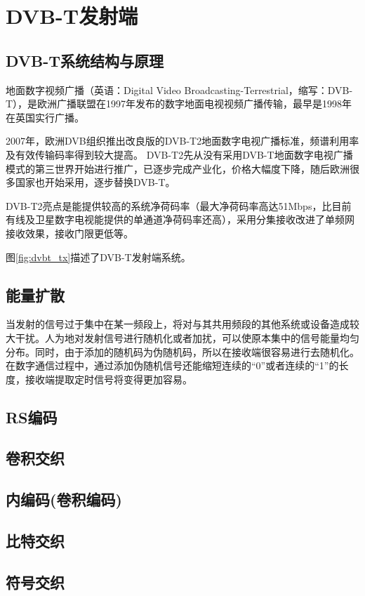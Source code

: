 \chapter{DVB-T发射端}
	\section{DVB-T系统结构与原理}
		\par 地面数字视频广播（英语：Digital Video Broadcasting-Terrestrial，缩写：DVB-T），是欧洲广播联盟在1997年发布的数字地面电视视频广播传输，最早是1998年在英国实行广播。
		\par 2007年，欧洲DVB组织推出改良版的DVB-T2地面数字电视广播标准，频谱利用率及有效传输码率得到较大提高。 DVB-T2先从没有采用DVB-T地面数字电视广播模式的第三世界开始进行推广，已逐步完成产业化，价格大幅度下降，随后欧洲很多国家也开始采用，逐步替换DVB-T。
		\par DVB-T2亮点是能提供较高的系统净荷码率（最大净荷码率高达51Mbps，比目前有线及卫星数字电视能提供的单通道净荷码率还高），采用分集接收改进了单频网接收效果，接收门限更低等。\cite{ wiki:DVB-T}\cite{_what_is_dvb_t}
		\par 图\ref{fig:dvbt_tx}描述了DVB-T发射端系统。
		
	\section{能量扩散}
		\par 当发射的信号过于集中在某一频段上，将对与其共用频段的其他系统或设备造成较大干扰。人为地对发射信号进行随机化或者加扰，可以使原本集中的信号能量均匀分布。同时，由于添加的随机码为伪随机码，所以在接收端很容易进行去随机化。在数字通信过程中，通过添加伪随机信号还能缩短连续的“0”或者连续的“1”的长度，接收端提取定时信号将变得更加容易。
	\section{RS编码}
	\section{卷积交织}
	\section{内编码(卷积编码)}
	\section{比特交织}
	\section{符号交织}
